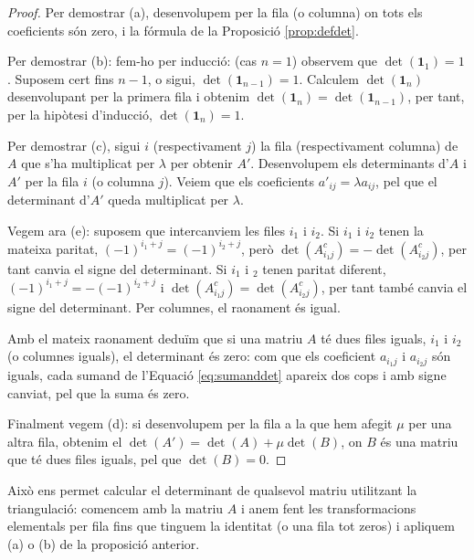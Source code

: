 \documentclass[a4paper,12pt,twoside]{article}
\newcommand{\1}{\mathbf{1}}
\newcommand{\0}{\mathbf{0}}
\theoremstyle{definition}
\theoremstyle{remark}
\begin{document}
\begin{proof}
	Per demostrar (a), desenvolupem per la fila (o columna) on tots els coeficients són zero, i la fórmula de la Proposició \ref{prop:defdet}.
	
	Per demostrar (b): fem-ho per inducció: (cas $n=1$) observem que $\det(\1_1)=1$. Suposem cert fins $n-1$, o sigui, $\det(\1_{n-1})=1$. Calculem $\det(\1_n)$  desenvolupant per la primera fila i obtenim $\det(\1_n)=\det(\1_{n-1})$, per tant, per la hipòtesi d'inducció, $\det(\1_n)=1$.
	
	Per demostrar (c), sigui $i$ (respectivament $j$) la fila (respectivament columna) de $A$ que s'ha multiplicat per $\lambda$ per obtenir $A'$. Desenvolupem els determinants d'$A$ i $A'$ per la fila $i$ (o columna $j$). Veiem que els coeficients $a'_{ij}=\lambda a_{ij}$, pel que el determinant d'$A'$ queda multiplicat per $\lambda$.
	
	Vegem ara (e): suposem que intercanviem les files $i_1$ i $i_2$. Si $i_1$ i $i_2$ tenen la mateixa paritat, $(-1)^{i_1+j}=(-1)^{i_2+j}$, però $\det(A_{i_1j}^c)=-\det(A_{i_2j}^c)$, per tant canvia el signe del determinant. Si $i_1$ i $_2$ tenen paritat diferent, $(-1)^{i_1+j}=-(-1)^{i_2+j}$ i $\det(A_{i_1j}^c)=\det(A_{i_2j}^c)$, per tant també canvia el signe del determinant. Per columnes, el raonament és igual.
	
	Amb el mateix raonament deduïm que si una matriu $A$ té dues files iguals, $i_1$ i $i_2$ (o columnes iguals), el determinant és zero: com que els coeficient $a_{i_1j}$ i $a_{i_2j}$ són iguals, cada sumand de l'Equació \eqref{eq:sumanddet} apareix dos cops i amb signe canviat, pel que la suma és zero. 
	
	Finalment vegem (d): si desenvolupem per la fila a la que hem afegit $\mu$ per una altra fila, obtenim el $\det(A')=\det(A)+\mu\det(B)$, on $B$ és una matriu que té dues files iguals, pel que $\det(B)=0$. 
\end{proof}
Això ens permet calcular el determinant de qualsevol matriu utilitzant la triangulació: comencem amb la matriu $A$ i anem fent les transformacions elementals per fila fins que tinguem la identitat (o una fila tot zeros) i apliquem (a) o (b) de la proposició anterior.
\end{document}
